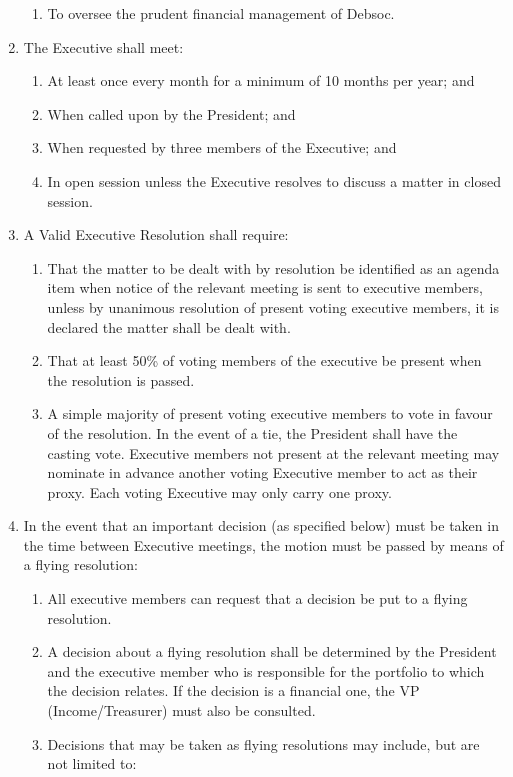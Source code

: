 \begin{enumerate}
\begin{enumerate}
  \item To oversee the prudent financial management of Debsoc.
  \end{enumerate}
\item The Executive shall meet:
  \begin{enumerate}
  \item At least once every month for a minimum of 10 months per year; and
  \item When called upon by the President; and
  \item When requested by three members of the Executive; and
  \item In open session unless the Executive resolves to discuss a matter in closed session.
  \end{enumerate}
\item A Valid Executive Resolution shall require:
  \begin{enumerate}
  \item That the matter to be dealt with by resolution be identified as an agenda item when notice of the relevant meeting is sent to executive members, unless by unanimous resolution of present voting executive members, it is declared the matter shall be dealt with.
  \item That at least 50\% of voting members of the executive be present when the resolution is passed.
  \item A simple majority of present voting executive members to vote in favour of the resolution. In the event of a tie, the President shall have the casting vote. Executive members not present at the relevant meeting may nominate in advance another voting Executive member to act as their proxy. Each voting Executive may only carry one proxy.
  \end{enumerate}
\item In the event that an important decision (as specified below) must be taken in the time between Executive meetings, the motion must be passed by means of a flying resolution: \label{flying_resolution}
  \begin{enumerate}
  \item All executive members can request that a decision be put to a flying resolution.
  \item A decision about a flying resolution shall be determined by the President and the executive member who is responsible for the portfolio to which the decision relates. If the decision is a financial one, the VP (Income/Treasurer) must also be consulted.
  \item Decisions that may be taken as flying resolutions may include, but are not limited to:

\end{enumerate}
\end{enumerate}
